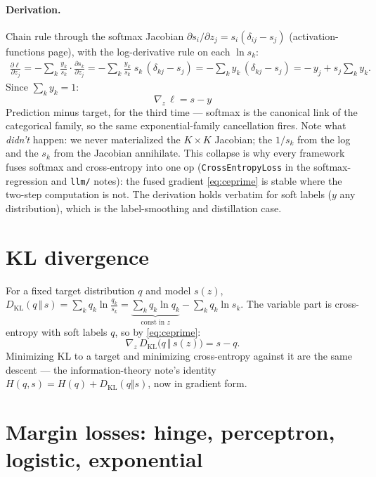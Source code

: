 \documentclass[11pt]{article}
\begin{document}
\paragraph{Derivation.} Chain rule through the softmax Jacobian
$\partial s_i/\partial z_j = s_i(\delta_{ij} - s_j)$
(activation-functions page), with the log-derivative rule on each
$\ln s_k$:
\begin{align*}
  \frac{\partial \ell}{\partial z_j}
  = -\sum_{k} \frac{y_k}{s_k}\cdot\frac{\partial s_k}{\partial z_j}
  = -\sum_{k} \frac{y_k}{s_k}\; s_k\,(\delta_{kj} - s_j)
  = -\sum_{k} y_k\,(\delta_{kj} - s_j)
  = -\,y_j + s_j \sum_{k} y_k .
\end{align*}
Since $\sum_k y_k = 1$:
\begin{equation}
  \boxed{\;\nabla_z\,\ell = s - y\;}
  \label{eq:ceprime}
\end{equation}
Prediction minus target, for the third time --- softmax is the
canonical link of the categorical family, so the same
exponential-family cancellation fires. Note what \emph{didn't} happen:
we never materialized the $K \times K$ Jacobian; the $1/s_k$ from the
log and the $s_k$ from the Jacobian annihilate. This collapse is why
every framework fuses softmax and cross-entropy into one op
(\texttt{CrossEntropyLoss} in the softmax-regression and
\texttt{llm/} notes): the fused gradient \eqref{eq:ceprime} is stable
where the two-step computation is not. The derivation holds verbatim
for soft labels ($y$ any distribution), which is the label-smoothing
and distillation case.

\section{KL divergence}

For a fixed target distribution $q$ and model $s(z)$,
$D_{\mathrm{KL}}(q\,\Vert\,s) = \sum_k q_k \ln\frac{q_k}{s_k}
= \underbrace{\textstyle\sum_k q_k \ln q_k}_{\text{const in } z}
- \sum_k q_k \ln s_k$. The variable part is cross-entropy with soft
labels $q$, so by \eqref{eq:ceprime}:
\begin{equation}
  \nabla_z\, D_{\mathrm{KL}}\bigl(q \,\Vert\, s(z)\bigr) = s - q .
  \label{eq:klprime}
\end{equation}
Minimizing KL to a target and minimizing cross-entropy against it are
the same descent --- the information-theory note's identity
$H(q, s) = H(q) + D_{\mathrm{KL}}(q\Vert s)$, now in gradient form.

\section{Margin losses: hinge, perceptron, logistic, exponential}
\end{document}
